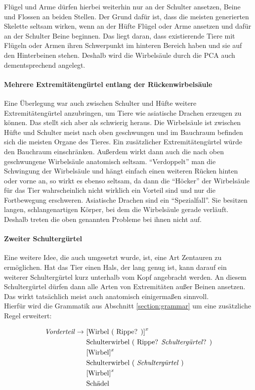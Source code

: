 Flügel und Arme dürfen hierbei weiterhin nur an der Schulter ansetzen, Beine und Flossen an beiden Stellen. Der Grund dafür ist, dass die meisten generierten Skelette seltsam wirken, wenn an der Hüfte Flügel oder Arme ansetzen und dafür an der Schulter Beine beginnen. Das liegt daran, dass existierende Tiere mit Flügeln oder Armen ihren Schwerpunkt im hinteren Bereich haben und sie auf den Hinterbeinen stehen. Deshalb wird die Wirbelsäule durch die PCA auch dementsprechend angelegt.

\paragraph{Mehrere Extremitätengürtel entlang der Rückenwirbelsäule}
Eine Überlegung war auch zwischen Schulter und Hüfte weitere Extremitätengürtel anzubringen, um \zb Tiere wie asiatische Drachen erzeugen zu können. Das stellt sich aber als schwierig heraus. Die Wirbelsäule ist zwischen Hüfte und Schulter meist nach oben geschwungen und im Bauchraum befinden sich die meisten Organe des Tieres. Ein zusätzlicher Extremitätengürtel würde den Bauchraum einschränken. Außerdem wirkt dann auch die nach oben geschwungene Wirbelsäule anatomisch seltsam.
"`Verdoppelt"' man die Schwingung der Wirbelsäule und hängt einfach einen weiteren Rücken hinten oder vorne an, so wirkt es ebenso seltsam, da dann die "`Höcker"' der Wirbelsäule für das Tier wahrscheinlich nicht wirklich ein Vorteil sind und nur die Fortbewegung erschweren.
Asiatische Drachen sind ein "`Spezialfall"'. Sie besitzen langen, schlangenartigen Körper, bei dem die Wirbelsäule gerade verläuft. Deshalb treten die oben genannten Probleme bei ihnen nicht auf.

\paragraph{Zweiter Schultergürtel}
Eine weitere Idee, die auch umgesetzt wurde, ist, eine Art Zentauren zu ermöglichen. Hat das Tier einen Hals, der lang genug ist, kann darauf ein weiterer Schultergürtel kurz unterhalb vom Kopf angebracht werden. An diesem Schultergürtel dürfen dann alle Arten von Extremitäten außer Beinen ansetzen. Das wirkt tatsächlich meist auch anatomisch einigermaßen sinnvoll.\\
Hierfür wird die Grammatik aus Abschnitt \ref{section:grammar} um eine zusätzliche Regel erweitert:

\begin{align*}
 \text{\emph{Vorderteil}} \rightarrow &\text{ [Wirbel ( Rippe? )]}^x\\
    &\text{ Schulterwirbel ( Rippe? \emph{Schultergürtel}? )}\\
    &\text{ [Wirbel]}^x\\
    &\text{ Schulterwirbel ( \emph{Schultergürtel} )}\\
    &\text{ [Wirbel]}^x\\
    &\text{ Schädel}
\end{align*}

